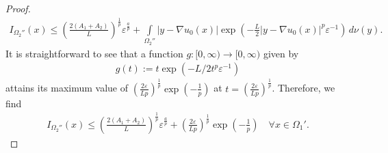 \documentclass[reqno,12pt]{article}
\newcommand{\I}{\int\limits}
\begin{document}
\begin{proof}
\begin{align*}
    I_{\Omega_{2}''}(x) \leqslant
    \left( \frac{2(A_{1}+A_{2})}{L} \right)^{\frac{1}{p}}\varepsilon^{\frac{a}{p}} + \I_{\Omega_{2}''} |y-\nabla u_0(x)|\exp\left(-\frac{L}{2}|y-\nabla u_0(x)|^{p}\varepsilon^{-1} \right)\,d\nu(y).
\end{align*}
It is straightforward to see that a function $g : [0,\infty)\rightarrow [0,\infty)$ given by 
\begin{align*}
    g(t) := t\exp \left(-L/2t^{p}\varepsilon^{-1} \right)
\end{align*}
attains its maximum value of $\left( \frac{2\varepsilon}{Lp} \right)^{\frac{1}{p}}\exp\left(  - \frac{1}{p} \right)$ at $t = \left(\frac{2\varepsilon}{Lp} \right)^{\frac{1}{p}}$. Therefore, we find
\begin{align}
    \label{ABF:s3:9}
    I_{\Omega_{2}''}(x)
    \leqslant
    \left( \frac{2(A_{1}+A_{2})}{L} \right)^{\frac{1}{p}}\varepsilon^{\frac{a}{p}} + 
    \left( \frac{2\varepsilon}{Lp} \right)^{\frac{1}{p}}\exp\left(- \frac{1}{p} \right)
    \quad\forall x\in \Omega_{1}'.
\end{align}


\end{proof}
\end{document}
